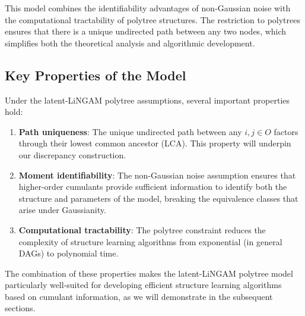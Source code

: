 \documentclass[11pt,a4paper]{article}
\numberwithin{equation}{section}
\begin{document}
This model combines the identifiability advantages of non-Gaussian noise with the computational tractability of polytree structures. The restriction to polytrees ensures that there is a unique undirected path between any two nodes, which simplifies both the theoretical analysis and algorithmic development.

\subsection{Key Properties of the Model}

Under the latent-LiNGAM polytree assumptions, several important properties hold:

\begin{enumerate}[label=(\arabic*)]
\item \textbf{Path uniqueness}: The unique undirected path between any $i,j\in O$ factors through their lowest common ancestor (LCA). This property will underpin our discrepancy construction.

\item \textbf{Moment identifiability}: The non-Gaussian noise assumption ensures that higher-order cumulants provide sufficient information to identify both the structure and parameters of the model, breaking the equivalence classes that arise under Gaussianity.

\item \textbf{Computational tractability}: The polytree constraint reduces the complexity of structure learning algorithms from exponential (in general DAGs) to polynomial time.
\end{enumerate}

The combination of these properties makes the latent-LiNGAM polytree model particularly well-suited for developing efficient structure learning algorithms based on cumulant information, as we will demonstrate in the subsequent sections.

\end{document}
